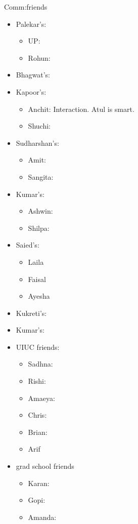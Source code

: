 \begin{columns}
\begin{column}{0.333\columnwidth}
  \begin{block}{Comm:friends} 
    \begin{itemize} 
    \item Palekar’s:  
      \begin{itemize}
      \item UP: 
      \item Rohun: 
      \end{itemize} 
    \item Bhagwat’s: 
    \item Kapoor’s: 
      \begin{itemize}
        \tiny \item \tiny Anchit: Interaction. Atul is smart. 
      \item \tiny Shuchi: 
      \end{itemize}
    \item Sudharshan’s: 
      \begin{itemize} 
        \tiny \item \tiny Amit:  
      \item \tiny Sangita:  
      \end{itemize}
    \item Kumar’s:
      \begin{itemize}
        \tiny \item \tiny Ashwin: 
      \item \tiny Shilpa: 
      \end{itemize}
    \item Saied’s: 
      \begin{itemize}
        \tiny \item \tiny Laila 
      \item \tiny Faisal 
      \item \tiny Ayesha
      \end{itemize} 
    \item Kukreti’s:
    \item Kumar’s:
    \item UIUC friends: 
      \begin{itemize} 
        \tiny \item \tiny Sadhna: 
      \item \tiny Rishi: 
      \item \tiny Amaeya: 
      \item \tiny Chris: 
      \item \tiny Brian: 
      \item \tiny Arif 
      \end{itemize}
    \item grad school friends 
      \begin{itemize} 
        \tiny \item \tiny  Karan: 
      \item \tiny Gopi: 
      \item \tiny Amanda:  
      \end{itemize}
    \end{itemize} 
  \end{block}
  

\end{column}
\end{columns}
